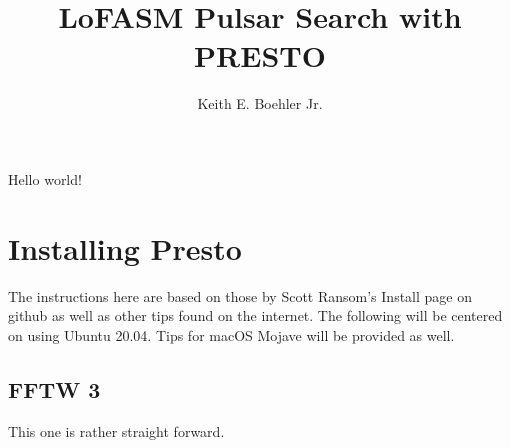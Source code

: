 \documentclass{article}
\title{LoFASM Pulsar Search with PRESTO}
\author{Keith E. Boehler Jr.}
\date{}
\begin{document}
   \maketitle
   Hello world!
   
   \section{Installing Presto}
   The instructions here are based on those by Scott Ransom's Install page on github as well as other 
   tips found on the internet. The following will be centered on using Ubuntu 20.04. Tips for macOS Mojave
   will be provided as well. 
   
   \subsection{FFTW 3}
    This one is rather straight forward. 
    
\end{document}
